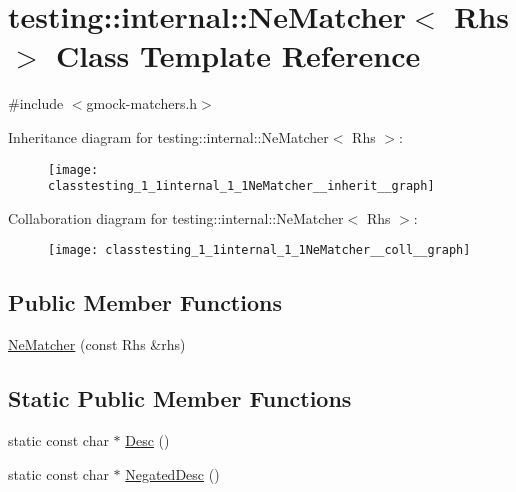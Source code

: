 \hypertarget{classtesting_1_1internal_1_1NeMatcher}{}\section{testing\+:\+:internal\+:\+:Ne\+Matcher$<$ Rhs $>$ Class Template Reference}
\label{classtesting_1_1internal_1_1NeMatcher}


{\ttfamily \#include $<$gmock-\/matchers.\+h$>$}



Inheritance diagram for testing\+:\+:internal\+:\+:Ne\+Matcher$<$ Rhs $>$\+:\nopagebreak
\begin{figure}[H]
\begin{center}
\leavevmode
\texttt{[image: classtesting\_1\_1internal\_1\_1NeMatcher\_\_inherit\_\_graph]}
\end{center}
\end{figure}


Collaboration diagram for testing\+:\+:internal\+:\+:Ne\+Matcher$<$ Rhs $>$\+:\nopagebreak
\begin{figure}[H]
\begin{center}
\leavevmode
\texttt{[image: classtesting\_1\_1internal\_1\_1NeMatcher\_\_coll\_\_graph]}
\end{center}
\end{figure}
\subsection*{Public Member Functions}
\begin{DoxyCompactItemize}
\item 
\hyperlink{classtesting_1_1internal_1_1NeMatcher_a64842882811cc96624c87119c51edd3e}{Ne\+Matcher} (const Rhs \&rhs)
\end{DoxyCompactItemize}
\subsection*{Static Public Member Functions}
\begin{DoxyCompactItemize}
\item 
static const char $\ast$ \hyperlink{classtesting_1_1internal_1_1NeMatcher_a2ec33febe5471f9d435b4dc9f5cda564}{Desc} ()
\item 
static const char $\ast$ \hyperlink{classtesting_1_1internal_1_1NeMatcher_a9ea152391b69d422ba2a88c3d2d2dae5}{Negated\+Desc} ()
\end{DoxyCompactItemize}


